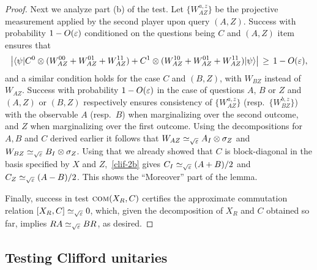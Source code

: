 \begin{proof}
Next we analyze part (b) of the test. Let $\{W_{AZ}^{a,z}\}$ be the projective measurement applied by the second player upon query $(A,Z)$. Success with probability $1-O(\varepsilon)$ conditioned on the questions being $C$ and $(A,Z)$ item ensures that 
\begin{equation}\label{clif-2b}
\big| \langle\psi| C^0 \otimes (W_{AZ}^{00} + W_{AZ}^{01} + W_{AZ}^{11}) + C^1\otimes (W_{AZ}^{10} + W_{AZ}^{01} + W_{AZ}^{11}) |\psi\rangle \big| \,\geq\,1-O(\varepsilon),
\end{equation}
and a similar condition holds for the case $C$ and $(B,Z)$, with $W_{BZ}$ instead of $W_{AZ}$. Success with probability $1-O(\varepsilon)$ in the case of questions $A$, $B$ or $Z$ and $(A,Z)$ or $(B,Z)$ respectively ensures consistency of $\{W_{AZ}^{a,z}\}$ (resp.\ $\{W_{BZ}^{b,z}\}$) with the observable $A$ (resp.\ $B$) when marginalizing over the second outcome, and $Z$ when marginalizing over the first outcome. Using the decompositions for $A,B$ and $C$ derived earlier it follows that $W_{AZ} \simeq_{\sqrt{\varepsilon}} A_I \otimes \sigma_Z$ and $W_{BZ} \simeq_{\sqrt{\varepsilon}} B_I \otimes \sigma_Z$. Using that we already showed that $C$ is block-diagonal in the basis specified by $X$ and $Z$,~\eqref{clif-2b} gives $C_I \simeq_{\sqrt{\varepsilon}} (A+B)/2$ and $C_Z \simeq_{\sqrt{\varepsilon}} (A-B)/2$. This shows the ``Moreover'' part of the lemma. 

Finally, success in test $\textsc{com}(X_R,C)$ certifies the approximate commutation relation $[X_R,C]\simeq_{\sqrt{\varepsilon}} 0$, which, given the decomposition of $X_R$ and $C$ obtained so far, implies $RA \simeq_{\sqrt{\varepsilon}} B R$, as desired. 
\end{proof}



\subsection{Testing Clifford unitaries}
\label{sec:n-clifford}


